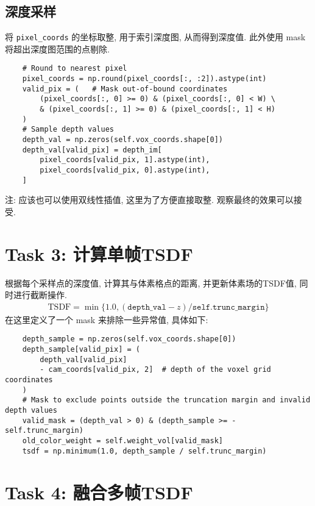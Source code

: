 \documentclass[11pt]{article}
\newcommand\1{\mathds{1}}
\begin{document}
\subsection{深度采样}
将 \texttt{pixel\_coords} 的坐标取整, 用于索引深度图, 从而得到深度值. 此外使用 mask 将超出深度图范围的点剔除. 
\begin{verbatim}
    # Round to nearest pixel
    pixel_coords = np.round(pixel_coords[:, :2]).astype(int)
    valid_pix = (   # Mask out-of-bound coordinates
        (pixel_coords[:, 0] >= 0) & (pixel_coords[:, 0] < W) \
        & (pixel_coords[:, 1] >= 0) & (pixel_coords[:, 1] < H)
    )
    # Sample depth values
    depth_val = np.zeros(self.vox_coords.shape[0])
    depth_val[valid_pix] = depth_im[
        pixel_coords[valid_pix, 1].astype(int),
        pixel_coords[valid_pix, 0].astype(int),
    ]
\end{verbatim}
注: 应该也可以使用双线性插值, 这里为了方便直接取整. 观察最终的效果可以接受.
\section{Task 3: 计算单帧TSDF}
根据每个采样点的深度值, 计算其与体素格点的距离, 并更新体素场的TSDF值, 同时进行截断操作.
\begin{align*}
    \text{TSDF} = \min \{ 1.0, (\texttt{depth\_val} - z)/\texttt{self.trunc\_margin}\}
\end{align*}
在这里定义了一个 mask 来排除一些异常值, 具体如下:
\begin{verbatim}
    depth_sample = np.zeros(self.vox_coords.shape[0])
    depth_sample[valid_pix] = (
        depth_val[valid_pix]
        - cam_coords[valid_pix, 2]  # depth of the voxel grid coordinates
    )
    # Mask to exclude points outside the truncation margin and invalid depth values
    valid_mask = (depth_val > 0) & (depth_sample >= -self.trunc_margin) 
    old_color_weight = self.weight_vol[valid_mask]
    tsdf = np.minimum(1.0, depth_sample / self.trunc_margin)
\end{verbatim}

\section{Task 4: 融合多帧TSDF}
\end{document}
